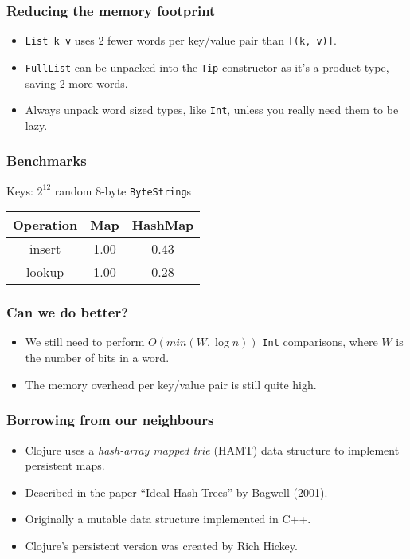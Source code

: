 \documentclass{beamer}
\begin{document}
\begin{frame}
  \frametitle{Reducing the memory footprint}
  \begin{itemize}
  \item \lstinline!List k v! uses 2 fewer words per key/value pair
    than \lstinline![(k, v)]!.
  \item \lstinline!FullList! can be unpacked into the \lstinline!Tip!
    constructor as it's a product type, saving 2 more words.
  \item Always unpack word sized types, like \lstinline!Int!, unless
    you really need them to be lazy.
  \end{itemize}
\end{frame}

\begin{frame}
  \frametitle{Benchmarks}

  Keys: $2^{12}$ random 8-byte \lstinline!ByteString!s

  \bigskip
  \begin{tabular}{|c|c|c|}
    \hline \textbf{Operation} & \textbf{Map} & \textbf{HashMap} \\
    \hline insert & 1.00 & 0.43 \\
    \hline lookup & 1.00 & 0.28 \\
    \hline
  \end{tabular}
\end{frame}

\begin{frame}
  \frametitle{Can we do better?}
  \begin{itemize}
  \item We still need to perform $O(min(W, \log n))$ \lstinline!Int!
    comparisons, where $W$ is the number of bits in a word.
  \item The memory overhead per key/value pair is still quite high.
  \end{itemize}
\end{frame}

\begin{frame}
  \frametitle{Borrowing from our neighbours}
  \begin{itemize}
  \item Clojure uses a \emph{hash-array mapped trie} (HAMT) data
    structure to implement persistent maps.
  \item Described in the paper ``Ideal Hash Trees'' by Bagwell (2001).
  \item Originally a mutable data structure implemented in C++.
  \item Clojure's persistent version was created by Rich Hickey.
  \end{itemize}
\end{frame}
\end{document}
